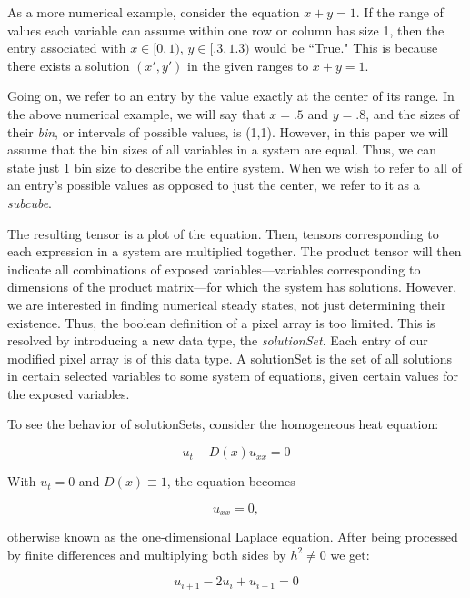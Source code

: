 \documentclass[11pt]{article}
\begin{document}
As a more numerical example, consider the equation $x + y = 1$. If the range of values each variable can assume within one row or column has size 1, then the entry associated with $x \in [0,1)$, $y \in [.3,1.3)$ would be ``True." This is because there exists a solution $(x',y')$ in the given ranges to $x + y = 1$. 

Going on, we refer to an entry by the value exactly at the center of its range. In the above numerical example, we will say that $x = .5$ and $y = .8$, and the sizes of their \textit{bin}, or intervals of possible values, is (1,1). However, in this paper we will assume that the bin sizes of all variables in a system are equal. Thus, we can state just 1 bin size to describe the entire system. When we wish to refer to all of an entry's possible values as opposed to just the center, we refer to it as a \textit{subcube}.

The resulting tensor is a plot of the equation. Then, tensors corresponding to each expression in a system are multiplied together. The product tensor will then indicate all combinations of exposed variables---variables corresponding to dimensions of the product matrix---for which the system has solutions. However, we are interested in finding numerical steady states, not just determining their existence. Thus, the boolean definition of a pixel array is too limited. This is resolved by introducing a new data type, the \textit{solutionSet}. Each entry of our modified pixel array is of this data type. A solutionSet is the set of all solutions in certain selected variables to some system of equations, given certain values for the exposed variables.

To see the behavior of solutionSets, consider the homogeneous heat equation:

\begin{equation}
    \label{general homogeneous heat}
    u_t - D(x)u_{xx} = 0
\end{equation}

\noindent With $u_t = 0$ and $D(x) \equiv 1$, the equation becomes

\begin{equation}
    \label{homogeneous heat}
    u_{xx} = 0,
\end{equation}

\noindent otherwise known as the one-dimensional Laplace equation. After being processed by finite differences and multiplying both sides by $h^2 \ne 0$ we get: 

\begin{equation}
    \label{discrete heat}
    u_{i+1} - 2u_i + u_{i-1} = 0
\end{equation}
\end{document}
